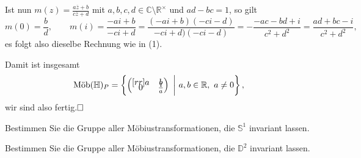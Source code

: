 \documentclass[11pt]{book}
\numberwithin{dummy}{section}
\theoremstyle{nonumberbreak}
\newenvironment{prob}[1][]{\ifthenelse{\equal{#1}{}}{\problem}{\problem[#1]}\rm}{\endproblem}
\newenvironment{sol}[1][]{\ifthenelse{\equal{#1}{}}{\solution}{\solution[#1]}\rm}{\endsolution}
\newcommand{\C}{\mathbb{C}}
\newcommand{\R}{\mathbb{R}}
\newcommand{\Sph}{\mathbb{S}}
\newcommand{\He}{\mathbb{H}}
\newcommand{\D}{\mathbb{D}}
\newcommand{\amob}{\textup{Möb}}
\newcommand{\matx}[4]{\begin{pmatrix}[rr]#1 & #2 \\[-6pt] #3 & #4 \end{pmatrix}}
\begin{document}
\begin{spacing}{1.4}
\begin{prob}
\begin{sol}
\begin{compactenum}
\begin{compactenum}
\item Ist nun $m(z)= \frac{a\overline{z}+b}{c\overline{z}+d}$ mit $a,b,c,d \in \C \setminus \R^{\times}$ und $ad-bc=1$, so gilt 
$$m(0)= \frac{b}{d}, \qquad m(i)= \frac{-ai+b}{-ci+d} = \frac{(-ai+b)(-ci-d)}{-ci+d)(-ci-d)} = -\frac{-ac-bd+i}{c^2+d^2} = \frac{ad+bc-i}{c^2+d^2},$$
es folgt also dieselbe Rechnung wie in (1).
\end{compactenum}
Damit ist insgesamt 
$$\amob(\He)_P = \left\{ \matx{a}{b}{0}{\frac{1}{a}} \ \bigg \vert \ a,b \in \R, \ a \neq 0 \right\},$$
wir sind also fertig.$\hfill \Box$



\end{compactenum}
\end{sol}


\end{prob}

\newpage

\begin{prob}    %
\begin{compactenum}
\item Bestimmen Sie die Gruppe aller Möbiustransformationen, die $\Sph^1$ invariant lassen.
\item Bestimmen Sie die Gruppe aller Möbiustransformationen, die $\D^2$ invariant lassen.

\end{compactenum}



\end{prob}
\end{spacing}
\end{document}
